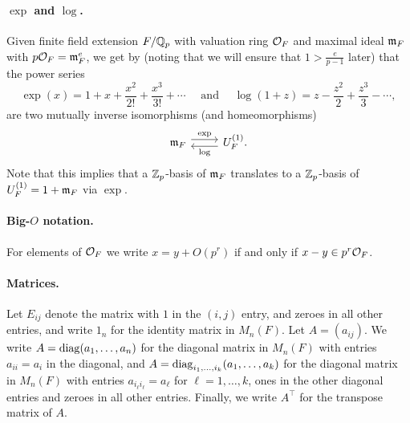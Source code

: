 \paragraph{$\exp$ and $\log$.} Given finite field extension $F/\mathbb{Q}_{p}$ with valuation ring $\mathcal{O}_{F}$ and maximal ideal $\mathfrak{m}_{F}$ with $p\mathcal{O}_{F} = \mathfrak{m}_{F}^{e}$, we get by \cite[Prop.~(5.5)]{Neukirch} (noting that we will ensure that $1 > \frac{e}{p-1}$ later) that the power series
\begin{equation*}
  \exp(x) = 1 + x + \frac{x^{2}}{2!} + \frac{x^{3}}{3!} + \dotsb \quad \text{ and } \quad \log(1+z) = z - \frac{z^{2}}{2} + \frac{z^{3}}{3} - \dotsb,
\end{equation*}
are two mutually inverse isomorphisms (and homeomorphisms)
\[
  \begin{tikzcd}
    \idm_{F} \ar[r, yshift=0.7ex, "\exp"] & U_{F}^{(1)}. \ar[l, yshift=-0.7ex, "\log"]
  \end{tikzcd}
\]
Note that this implies that a $\mathbb{Z}_{p}$-basis of $\mathfrak{m}_{F}$ translates to a $\mathbb{Z}_{p}$-basis of $U_{F}^{(1)} = 1+\mathfrak{m}_{F}$ via $\exp$.

\paragraph{Big-$O$ notation.} For elements of $\mathcal{O}_{F}$ we write $x = y + O(p^{r})$ if and only if $x-y \in p^{r}\mathcal{O}_{F}$.

\paragraph{Matrices.} Let $E_{ij}$ denote the matrix with $1$ in the $(i,j)$ entry, and zeroes in all other entries, and write $1_{n}$ for the identity matrix in $M_{n}(F)$. Let $A = (a_{ij})$. We write $A = \operatorname{diag}(a_{1},\dotsc,a_{n})$ for the diagonal matrix in $M_{n}(F)$ with entries $a_{ii}=a_{i}$ in the diagonal, and $A = \operatorname{diag}_{i_{1},\dotsc,i_{k}}(a_{1},\dotsc,a_{k})$ for the diagonal matrix in $M_{n}(F)$ with entries $a_{i_{\ell}i_{\ell}} = a_{\ell}$ for $\ell = 1,\dotsc,k$, ones in the other diagonal entries and zeroes in all other entries. Finally, we write $A^{\top}$ for the transpose matrix of $A$.


